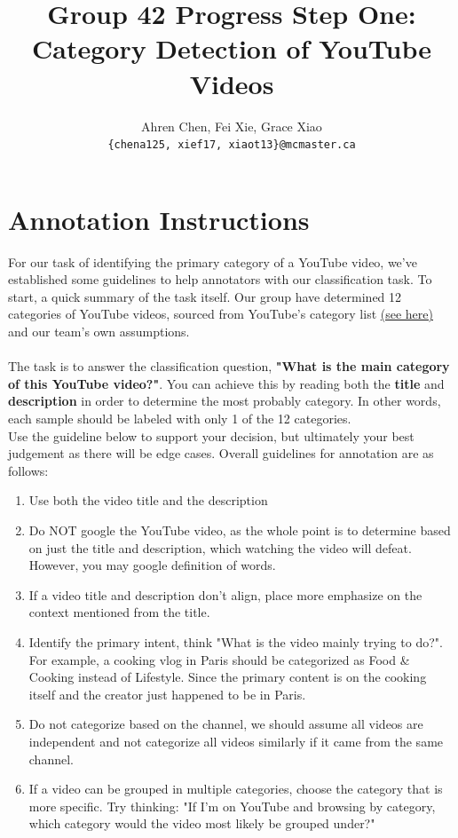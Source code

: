 \documentclass[11pt]{article}
\title{Group 42 Progress Step One:\\ Category Detection of YouTube Videos}
\author{
  Ahren Chen, Fei Xie, Grace Xiao\\
  \texttt{\{chena125, xief17, xiaot13\}@mcmaster.ca}
}
\begin{document}
\maketitle

\section{Annotation Instructions}
For our task of identifying the primary category of a YouTube video, we've established some guidelines to help annotators with our classification task. To start, a quick summary of the task itself.
Our group have determined 12 categories of YouTube videos, sourced from YouTube's category list \href{https://mixedanalytics.com/blog/list-of-youtube-video-category-ids/}{(see here)} and our team's own assumptions. 
\\ \\
The task is to answer the classification question, \textbf{"What is the main category of this YouTube video?"}. You can achieve this by reading both the \textbf{title} and \textbf{description} in order to determine the most probably category. In other words, each sample should be labeled with only 1 of the 12 categories.
\\
Use the guideline below to support your decision, but ultimately your best judgement as there will be edge cases.
Overall guidelines for annotation are as follows:
\begin{enumerate}
  \item Use both the video title and the description
  \item Do NOT google the YouTube video, as the whole point is to determine based on just the title and description, which watching the video will defeat. However, you may google definition of words.
  \item If a video title and description don't align, place more emphasize on the context mentioned from the title.
  \item Identify the primary intent, think "What is the video mainly trying to do?". For example, a cooking vlog in Paris should be categorized as Food \& Cooking instead of Lifestyle. Since the primary content is on the cooking itself and the creator just happened to be in Paris.
  \item Do not categorize based on the channel, we should assume all videos are independent and not categorize all videos similarly if it came from the same channel.
  \item If a video can be grouped in multiple categories, choose the category that is more specific. Try thinking: "If I'm on YouTube and browsing by category, which category would the video most likely be grouped under?"
\end{enumerate}
\end{document}
